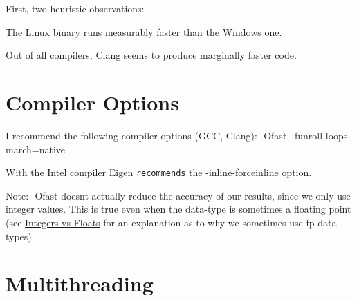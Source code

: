 First, two heuristic observations\+:


\begin{DoxyItemize}
\item The Linux binary runs measurably faster than the Windows one.
\item Out of all compilers, Clang seems to produce marginally faster code.
\end{DoxyItemize}\hypertarget{perf_compoptions}{}\section{Compiler Options}\label{perf_compoptions}

\begin{DoxyItemize}
\item I recommend the following compiler options (G\+CC, Clang)\+: {\ttfamily -\/\+Ofast --funroll-\/loops -\/march=native }
\item With the Intel compiler Eigen \href{ http://eigen.tuxfamily.org/index.php?title=Main_Page#Compiler_support}{\tt recommends} the {\ttfamily -\/inline-\/forceinline} option.
\item Note\+: {\ttfamily -\/\+Ofast} doesn\textquotesingle{}t actually reduce the accuracy of our results, since we only use integer values. This is true even when the data-\/type is sometimes a floating point (see \hyperlink{perf_intvsfloat}{Integers vs Floats} for an explanation as to why we sometimes use fp data types).
\end{DoxyItemize}\hypertarget{perf_thread}{}\section{Multithreading}\label{perf_thread}


